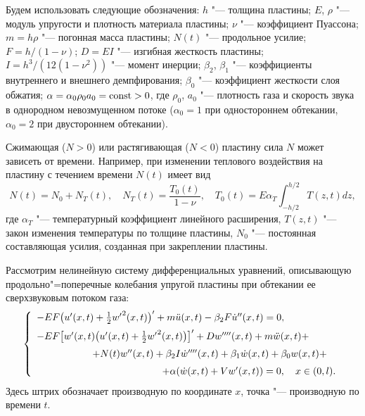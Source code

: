 Будем использовать следующие обозначения:  
$h$ "--- толщина пластины; 
$E$, $\rho$ "--- модуль упругости и плотность материала пластины; 
$\nu $ "--- коэффициент Пуассона;
$m=h\rho$ "--- погонная масса пластины;  
$N(t)$ "--- продольное усилие; 
$F=h/ (1-\nu ) $; $D=EI$ "--- изгибная жесткость пластины; 
$I=h^{3} / (12(1-\nu ^{2} )) $ "--- момент инерции;  
$\beta _{2}$, $\beta _{1} $ "--- коэффициенты внутреннего и внешнего демпфирования; 
$\beta _{0} $ "--- коэффициент жесткости слоя обжатия; 
$\alpha =\alpha _{0} \rho _{0} a_{0} ={\rm const}>0$, 
где $\rho _{0}$, $a_{0} $ "--- плотность газа и скорость звука в однородном невозмущенном потоке ($\alpha _{0} =1$ при одностороннем обтекании, $\alpha _{0} =2$ при двустороннем обтекании).



Сжимающая ($N>0$) или растягивающая ($N<0$) пластину сила $N$ может зависеть от времени. Например, при изменении теплового воздействия на пластину с течением времени $N(t)$ имеет вид
\begin{equation} 
\label{Velmisov1} 
N\left(t\right)=N_{0} +N_{T} (t),\quad N_{T} (t)=\frac{T_{0} (t)}{1-\nu } ,\quad T_{0} (t)=E\alpha _{T} \int_{-h/2}^{h/2}T\left(z,t\right)dz,  
\end{equation} 
где $\alpha _{T} $ "--- температурный коэффициент линейного расширения, $T(z,t)$ "--- закон изменения температуры по толщине пластины, $N_{0} $ "--- постоянная составляющая усилия, созданная при закреплении пластины.

Рассмотрим нелинейную систему дифференциальных уравнений, описывающую продольно"=поперечные колебания упругой пластины при обтекании ее сверхзвуковым потоком газа:
\begin{equation} 
\label{Velmisov2} 
\left\{\begin{array}{l} 
-EF\bigl(u'(x,t)+\frac{1}{2} {w'}^{2} (x,t)\bigr)' 
+m\ddot{u}(x,t)-\beta _{2}F \dot{u}''(x,t)=0,\\[2mm]
-EF\bigl[w'(x,t)\bigl(u'(x,t)+\frac{1}{2} {w'}^{2} (x,t)\bigr)\bigr]' +
Dw''''(x,t)+m\ddot{w}(x,t)+ 
\\[2mm] 
\hspace{2cm}
+N(t)w''(x,t)+\beta _{2} I{{\dot w}''''}(x,t)+\beta _{1} \dot{w}(x,t)+\beta _{0} w(x,t)+  \\[2mm]
\hspace{4.5cm}
+\alpha (\dot{w}(x,t)+Vw'(x,t))=0,\quad x\in (0,l). 
\end{array}
\right.  
\end{equation}
Здесь штрих обозначает производную по координате $x$, точка "--- производную по времени $t$.



